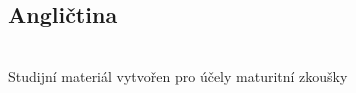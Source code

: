 \documentclass[../main.tex]{subfiles}
\begin{document}
\fontsize{10pt}{10pt}\selectfont\setlength\parindent{0em}
\pagestyle{empty}
\pagecolor{MPC}
\vspace{\fill}

\begin{center}
{\color{white}
\part{Angličtina}
}
{\color{white}\LARGE \WSauthor}\\
\vspace*{1em}
{\color{white}\Large Studijní materiál vytvořen pro účely maturitní zkoušky}
\end{center}


\newpage
\pagecolor{white}

\blankpage

\newpage
\end{document}
